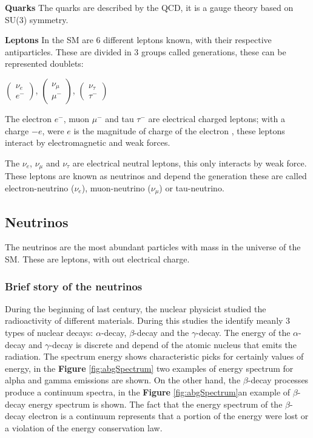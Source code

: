 \textbf{Quarks}
The quarks are described by the QCD, it is a gauge theory based on SU(3) symmetry.  

\textbf{Leptons}
In the SM are 6 different leptons known, with their respective antiparticles. These are divided in 3 groups called generations, these can be represented doublets: 

$\begin{pmatrix}
    \nu_e \\
    e^-
\end{pmatrix}$, 
$\begin{pmatrix}
    \nu_\mu \\
    \mu^-
\end{pmatrix}$, 
$\begin{pmatrix}
    \nu_\tau \\
    \tau^-
\end{pmatrix}$

The electron $e^-$, muon $\mu^-$ and tau $\tau^-$ are electrical charged leptons; with a charge $-e$, were $e$ is the magnitude of charge of the electron , these leptons interact by electromagnetic and weak forces. 

The $\nu_e$, $\nu_\mu$ and $\nu_\tau$ are electrical neutral leptons, this only interacts by weak force. These leptons are known as neutrinos and depend the generation these are called electron-neutrino ($\nu_e$), muon-neutrino ($\nu_\mu$) or tau-neutrino. 

\subsection{Neutrinos}
The neutrinos are the most abundant particles with mass in the universe of the SM. These are leptons, with out electrical charge. 

\subsubsection{Brief story of the neutrinos}
During the beginning of last century, the nuclear physicist studied the radioactivity of different materials. During this studies the identify meanly 3 types of nuclear decays: $\alpha$-decay, $\beta$-decay and the $\gamma$-decay. The energy of the  $\alpha$-decay and $\gamma$-decay is discrete and depend of the atomic nucleus that emits the radiation. The spectrum energy shows characteristic picks for certainly values of energy, in the \textbf{Figure} \ref{fig:abgSpectrum} two examples of energy spectrum for alpha and gamma emissions are shown. On the other hand, the $\beta$-decay processes produce a continuum spectra, in the \textbf{Figure} \ref{fig:abgSpectrum}an example of $\beta$-decay energy spectrum is shown. The fact that the energy spectrum of the $\beta$-decay electron is a continuum represents that a portion of the energy were lost or a violation of the energy conservation law.

